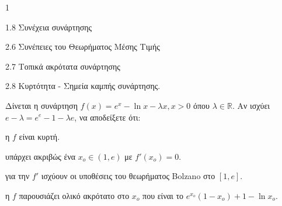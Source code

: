 \begin{ylh}{1}
    \item 1.8 Συνέχεια συνάρτησης
    \item 2.6 Συνέπειες του Θεωρήματος Μέσης Τιμής
    \item 2.7 Τοπικά ακρότατα συνάρτησης
    \item 2.8 Κυρτότητα - Σημεία καμπής συνάρτησης.
\end{ylh}
Δίνεται η συνάρτηση $f(x)=e^x-\ln x-\lambda x, x>0$ όπου $\lambda \in \mathbb{R}$. Αν ισχύει $e-\lambda = e^e-1-\lambda e$, να αποδείξετε ότι:
\begin{alist}
\item η $f$ είναι κυρτή. 
\item υπάρχει ακριβώς ένα $x_o \in (1,e)$ με $f'(x_o)=0$. 
\item για την $f'$ ισχύουν οι υποθέσεις του θεωρήματος Bolzano στο $[1,e]$. 
\item η $f$ παρουσιάζει ολικό ακρότατο στο $x_o$ που είναι το $e^{x_o}(1-x_o)+1-\ln x_o$. 
\end{alist}